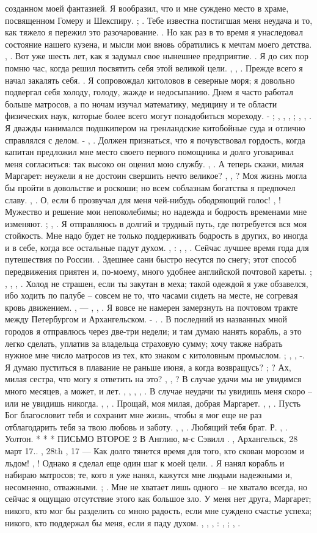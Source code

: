 созданном моей фантазией. Я вообразил, что и мне суждено место в храме, посвященном Гомеру и Шекспиру. ; . Тебе известна постигшая меня неудача и то, как тяжело я пережил это разочарование. . Но как раз в то время я унаследовал состояние нашего кузена, и мысли мои вновь обратились к мечтам моего детства. , . Вот уже шесть лет, как я задумал свое нынешнее предприятие. . Я до сих пор помню час, когда решил посвятить себя этой великой цели. , , . Прежде всего я начал закалять себя. . Я сопровождал китоловов в северные моря; я довольно подвергал себя холоду, голоду, жажде и недосыпанию. Днем я часто работал больше матросов, а по ночам изучал математику, медицину и те области физических наук, которые более всего могут понадобиться мореходу. - ; , , , ; , , . Я дважды нанимался подшкипером на гренландские китобойные суда и отлично справлялся с делом. - , . Должен признаться, что я почувствовал гордость, когда капитан предложил мне место своего первого помощника и долго уговаривал меня согласиться: так высоко он оценил мою службу. , . А теперь скажи, милая Маргарет: неужели я не достоин свершить нечто великое? , , ? Моя жизнь могла бы пройти в довольстве и роскоши; но всем соблазнам богатства я предпочел славу. , . О, если б прозвучал для меня чей-нибудь ободряющий голос! , ! Мужество и решение мои непоколебимы; но надежда и бодрость временами мне изменяют. ; , . Я отправляюсь в долгий и трудный путь, где потребуется вся моя стойкость. Мне надо будет не только поддерживать бодрость в других, во иногда и в себе, когда все остальные падут духом. , : , , . Сейчас лучшее время года для путешествия по России. . Здешнее сани быстро несутся по снегу; этот способ передвижения приятен и, по-моему, много удобнее английской почтовой кареты. ; , , , . Холод не страшен, если ты закутан в меха; такой одеждой я уже обзавелся, ибо ходить по палубе – совсем не то, что часами сидеть на месте, не согревая кровь движением. , — , , . Я вовсе не намерен замерзнуть на почтовом тракте между Петербургом и Архангельском. - . . В последний из названных мной городов я отправлюсь через две-три недели; и там думаю нанять корабль, а это легко сделать, уплатив за владельца страховую сумму; хочу также набрать нужное мне число матросов из тех, кто знаком с китоловным промыслом. ; , , -. Я думаю пуститься в плавание не раньше июня, а когда возвращусь? ; ? Ах, милая сестра, что могу я ответить на это? , , ? В случае удачи мы не увидимся много месяцев, а может, и лет. , , , , . В случае неудачи ты увидишь меня скоро – или не увидишь никогда. , , . Прощай, моя милая, добрая Маргарет. , , . Пусть Бог благословит тебя и сохранит мне жизнь, чтобы я мог еще не раз отблагодарить тебя за твою любовь и заботу. , , . Любящий тебя брат. Р. , . Уолтон. * * * ПИСЬМО ВТОРОЕ 2 В Англию, м-с Сэвилл . , Архангельск, 28 март 17.. , 28th , 17 — Как долго тянется время для того, кто скован морозом и льдом! , ! Однако я сделал еще один шаг к моей цели. . Я нанял корабль и набираю матросов; те, кого я уже нанял, кажутся мне людьми надежными и, несомненно, отважными. ; . Мне не хватает лишь одного – не хватало всегда, но сейчас я ощущаю отсутствие этого как большое зло. У меня нет друга, Маргарет; никого, кто мог бы разделить со мною радость, если мне суждено счастье успеха; никого, кто поддержал бы меня, если я паду духом. , , , : , ; , . 